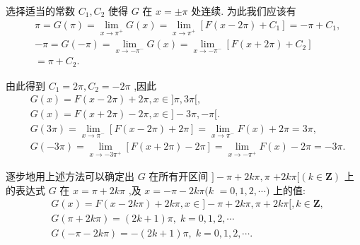 选择适当的常数 ${C}_{1},{C}_{2}$ 使得 $G$ 在 $x =  \pm  \pi$ 处连续. 为此我们应该有
\begin{align*}
	&\pi  = G\left( \pi \right)  = \mathop{\lim }\limits_{{x \rightarrow  {\pi }^{ + }}}G\left( x\right)  = \mathop{\lim }\limits_{{x \rightarrow  {\pi }^{ + }}}\left\lbrack  {F\left( {x - {2\pi }}\right)  + {C}_{1}}\right\rbrack   =  - \pi  + {C}_{1},\\
	&- \pi  = G\left( {-\pi }\right)  = \mathop{\lim }\limits_{{x \rightarrow   - {\pi }^{ - }}}G\left( x\right)  = \mathop{\lim }\limits_{{x \rightarrow   - {\pi }^{ - }}}\left\lbrack  {F\left( {x + {2\pi }}\right)  + {C}_{2}}\right\rbrack\\
	&= \pi  + {C}_{2}.
\end{align*}

由此得到 ${C}_{1} = {2\pi },{C}_{2} =  - {2\pi }$ ,因此
\begin{align*}
	&G\left( x\right)  = F\left( {x - {2\pi }}\right)  + {2\pi },x \in  \rbrack \pi ,{3\pi }\lbrack ,\\
	&G\left( x\right)  = F\left( {x + {2\pi }}\right)  - {2\pi },x \in  \rbrack  - {3\pi }, - \pi \lbrack .\\
	&G\left( {3\pi }\right)  = \mathop{\lim }\limits_{{x \rightarrow  {\pi }^{ - }}}\left\lbrack  {F\left( {x - {2\pi }}\right)  + {2\pi }}\right\rbrack   = \mathop{\lim }\limits_{{x \rightarrow  {\pi }^{ - }}}F\left( x\right)  + {2\pi } = {3\pi },\\
	&G\left( {-{3\pi }}\right)  = \mathop{\lim }\limits_{{x \rightarrow   - 3{\pi }^{ + }}}\left\lbrack  {F\left( {x + {2\pi }}\right)  - {2\pi }}\right\rbrack   = \mathop{\lim }\limits_{{x \rightarrow   - {\pi }^{ + }}}F\left( x\right)  - {2\pi } =  - {3\pi }.
\end{align*}

逐步地用上述方法可以确定出 $G$ 在所有开区间 $\rbrack  - \pi  + {2k\pi },\pi$  $+ {2k\pi }\lbrack \left( {k \in  \mathbf{Z}}\right)$ 上的表达式 $G$ 在 $x = \pi  + {2k\pi }$ ,及 $x =  - \pi  - {2k\pi }(k$  $= 0,1,2,\cdots )$ 上的值:
\begin{align*}
	&G\left( x\right)  = F\left( {x - {2k\pi }}\right)  + {2k\pi },x \in  \rbrack  - \pi  + {2k\pi },\pi  + {2k\pi }\lbrack ,k \in  \mathbf{Z},\\
	&G\left( {\pi  + {2k\pi }}\right)  = \left( {{2k} + 1}\right) \pi ,\;k = 0,1,2,\cdots\\
	&G\left( {-\pi  - {2k\pi }}\right)  =  - \left( {{2k} + 1}\right) \pi ,\;k = 0,1,2,\cdots .
\end{align*}

